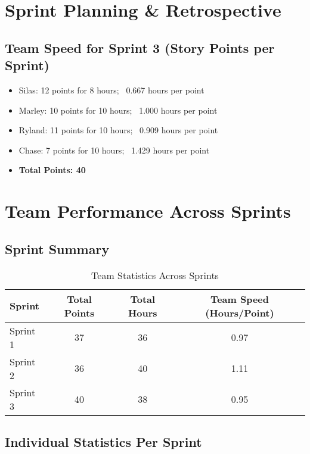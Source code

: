 \section{Sprint Planning \& Retrospective}

\subsection{Team Speed for Sprint 3 (Story Points per Sprint)}
\begin{itemize}
    \item Silas: 12 points for 8 hours; ~0.667 hours per point
    \item Marley: 10 points for 10 hours; ~1.000 hours per point
    \item Ryland: 11 points for 10 hours; ~0.909 hours per point
    \item Chase: 7 points for 10 hours; ~1.429 hours per point
    \item \textbf{Total Points: 40}
\end{itemize}

\section{Team Performance Across Sprints}

\subsection{Sprint Summary}
\begin{table}[H]
    \centering
    \begin{tabular}{|l|c|c|c|}
    \hline
    \textbf{Sprint} & \textbf{Total Points} & \textbf{Total Hours} & \textbf{Team Speed (Hours/Point)} \\ \hline
    Sprint 1 & 37 & 36 & 0.97 \\ \hline
    Sprint 2 & 36 & 40 & 1.11 \\ \hline
    Sprint 3 & 40 & 38 & 0.95 \\ \hline
    \end{tabular}
    \caption{Team Statistics Across Sprints}
    \label{tab:team_stats}
\end{table}

\subsection{Individual Statistics Per Sprint}

